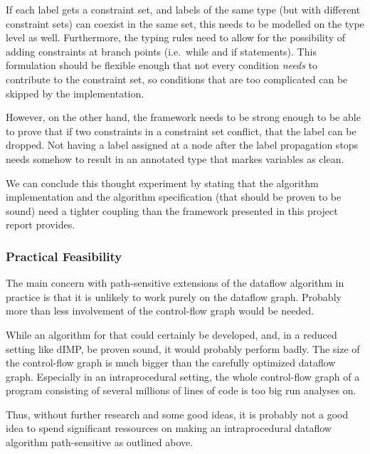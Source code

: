 If each label gets a constraint set, and labels of the same type (but with different constraint sets)
can coexist in the same set, this needs to be modelled on the type level as well.
Furthermore, the typing rules need to allow for the possibility of adding constraints at
branch points (i.e.\ while and if statements).
This formulation should be flexible enough that not every condition \emph{needs}
to contribute to the constraint set, so conditions that are too complicated can be skipped
by the implementation.

However, on the other hand, the framework needs to be strong enough to be able to prove that if
two constraints in a constraint set conflict, that the label can be dropped.
Not having a label assigned at a node after the label propagation stops needs somehow to 
result in an annotated type that markes variables as clean.

We can conclude this thought experiment by stating that the algorithm implementation and
the algorithm specification (that should be proven to be sound) need a tighter coupling
than the framework presented in this project report provides.

\subsubsection*{Practical Feasibility}
The main concern with path-sensitive extensions of the dataflow algorithm in practice is
that it is unlikely to work purely on the dataflow graph.
Probably more than less involvement of the control-flow graph would be needed.

While an algorithm for that could certainly be developed, and, in a reduced setting like
dIMP, be proven sound, it would probably perform badly.
The size of the control-flow graph is much bigger than the carefully optimized dataflow graph.
Especially in an intraprocedural setting, the whole control-flow graph of a program
consisting of several millions of lines of code is too big run analyses on.

Thus, without further research and some good ideas, it is probably not a good idea
to spend significant ressources on making an intraprocedural dataflow algorithm path-sensitive
as outlined above.
\fi
